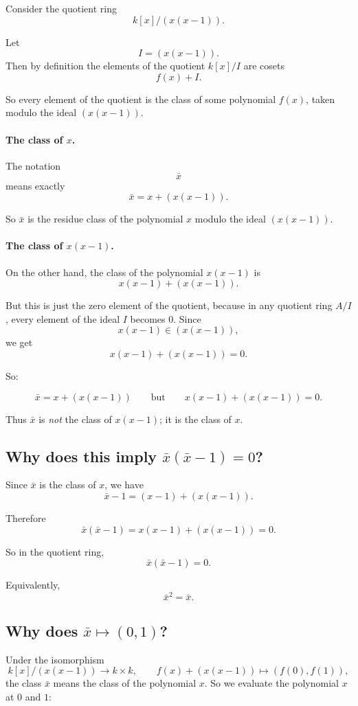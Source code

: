 \documentclass[12pt,a4paper]{article}
\theoremstyle{notespace}
\begin{document}
Consider the quotient ring
\[
k[x]/(x(x-1)).
\]

Let
\[
I=(x(x-1)).
\]
Then by definition the elements of the quotient \(k[x]/I\) are cosets
\[
f(x)+I.
\]

So every element of the quotient is the class of some polynomial \(f(x)\), taken modulo the ideal \((x(x-1))\).

\paragraph{The class of \(x\).}
The notation
\[
\bar x
\]
means exactly
\[
\bar x = x+(x(x-1)).
\]

So \(\bar x\) is the residue class of the polynomial \(x\) modulo the ideal \((x(x-1))\).

\paragraph{The class of \(x(x-1)\).}
On the other hand, the class of the polynomial \(x(x-1)\) is
\[
x(x-1)+(x(x-1)).
\]

But this is just the zero element of the quotient, because in any quotient ring \(A/I\), every element of the ideal \(I\) becomes \(0\). Since
\[
x(x-1)\in (x(x-1)),
\]
we get
\[
x(x-1)+(x(x-1))=0.
\]

So:

\[
\bar x = x+(x(x-1))
\qquad\text{but}\qquad
x(x-1)+(x(x-1))=0.
\]

Thus \(\bar x\) is \emph{not} the class of \(x(x-1)\); it is the class of \(x\).

\subsection{Why does this imply \(\bar x(\bar x-1)=0\)?}

Since \(\bar x\) is the class of \(x\), we have
\[
\bar x-1=(x-1)+(x(x-1)).
\]

Therefore
\[
\bar x(\bar x-1)
=
x(x-1)+(x(x-1))
=
0.
\]

So in the quotient ring,
\[
\bar x(\bar x-1)=0.
\]

Equivalently,
\[
\bar x^2=\bar x.
\]

\subsection{Why does \(\bar x\mapsto (0,1)\)?}

Under the isomorphism
\[
k[x]/(x(x-1))\longrightarrow k\times k,
\qquad
f(x)+(x(x-1))\longmapsto (f(0),f(1)),
\]
the class \(\bar x\) means the class of the polynomial \(x\). So we evaluate the polynomial \(x\) at \(0\) and \(1\):
\end{document}
